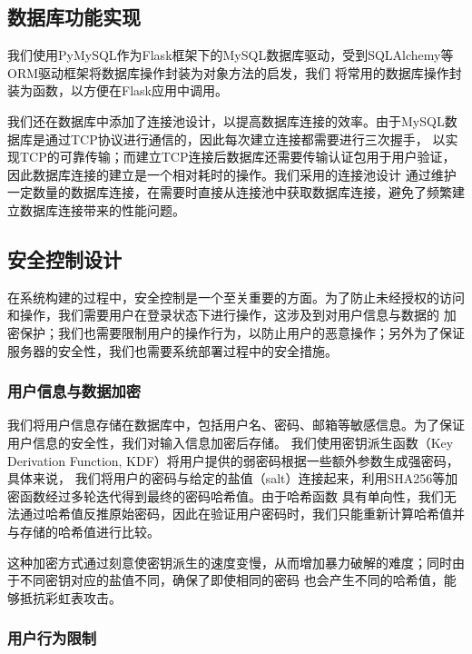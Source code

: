 \subsection{数据库功能实现}

我们使用PyMySQL作为Flask框架下的MySQL数据库驱动，受到SQLAlchemy等ORM驱动框架将数据库操作封装为对象方法的启发，我们
将常用的数据库操作封装为函数，以方便在Flask应用中调用。

我们还在数据库中添加了连接池设计，以提高数据库连接的效率。由于MySQL数据库是通过TCP协议进行通信的，因此每次建立连接都需要进行三次握手，
以实现TCP的可靠传输；而建立TCP连接后数据库还需要传输认证包用于用户验证，因此数据库连接的建立是一个相对耗时的操作。我们采用的连接池设计
通过维护一定数量的数据库连接，在需要时直接从连接池中获取数据库连接，避免了频繁建立数据库连接带来的性能问题。

\subsection{安全控制设计}

在系统构建的过程中，安全控制是一个至关重要的方面。为了防止未经授权的访问和操作，我们需要用户在登录状态下进行操作，这涉及到对用户信息与数据的
加密保护；我们也需要限制用户的操作行为，以防止用户的恶意操作；另外为了保证服务器的安全性，我们也需要系统部署过程中的安全措施。

\subsubsection{用户信息与数据加密}

我们将用户信息存储在数据库中，包括用户名、密码、邮箱等敏感信息。为了保证用户信息的安全性，我们对输入信息加密后存储。
我们使用密钥派生函数（Key Derivation Function, KDF）将用户提供的弱密码根据一些额外参数生成强密码，具体来说，
我们将用户的密码与给定的盐值（salt）连接起来，利用SHA256等加密函数经过多轮迭代得到最终的密码哈希值。由于哈希函数
具有单向性，我们无法通过哈希值反推原始密码，因此在验证用户密码时，我们只能重新计算哈希值并与存储的哈希值进行比较。

这种加密方式通过刻意使密钥派生的速度变慢，从而增加暴力破解的难度；同时由于不同密钥对应的盐值不同，确保了即使相同的密码
也会产生不同的哈希值，能够抵抗彩虹表攻击。

\subsubsection{用户行为限制}

